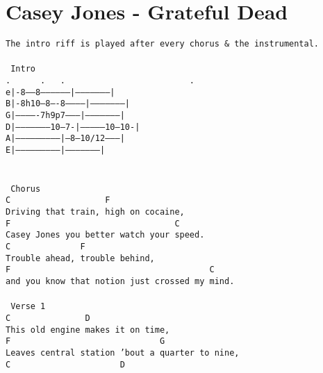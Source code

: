 \newpage
\section{Casey Jones - Grateful Dead}
\label{Casey Jones - Grateful Dead}
\texttt{The\ intro\ riff\ is\ played\ after\ every\ chorus\ \&\ the\ instrumental.\\
\\
\lbrack\ Intro\rbrack\\
. \ \ \ \ \ .\ \ \ .\ \ \ \ \ \ \ \ \ \ \ \ \ \ \ \ \ \ \ \ \ \ \ \ \ .\\
e|-8------8-----------------|---------------------|\\
B|-8h10---8----8------------|---------------------|\\
G|-------------7h9p7--------|---------------------|\\
D|--------------------10--7-|--------------10--10-|\\
A|--------------------------|---8---10/12---------|\\
E|--------------------------|---------------------|\\
\\
\\
\lbrack\ Chorus\rbrack\\
C\ \ \ \ \ \ \ \ \ \ \ \ \ \ \ \ \ \ \ F\\
Driving\ that\ train,\ high\ on\ cocaine,\\
F\ \ \ \ \ \ \ \ \ \ \ \ \ \ \ \ \ \ \ \ \ \ \ \ \ \ \ \ \ \ \ \ \ C\\
Casey\ Jones\ you\ better\ watch\ your\ speed.\\
C\ \ \ \ \ \ \ \ \ \ \ \ \ \ F\\
Trouble\ ahead,\ trouble\ behind,\\
F\ \ \ \ \ \ \ \ \ \ \ \ \ \ \ \ \ \ \ \ \ \ \ \ \ \ \ \ \ \ \ \ \ \ \ \ \ \ \ \ C\\
and\ you\ know\ that\ notion\ just\ crossed\ my\ mind.\\
\\
\lbrack\ Verse\ 1\rbrack\\
C\ \ \ \ \ \ \ \ \ \ \ \ \ \ \ D\\
This\ old\ engine\ makes\ it\ on\ time,\\
F\ \ \ \ \ \ \ \ \ \ \ \ \ \ \ \ \ \ \ \ \ \ \ \ \ \ \ \ \ \ G\\
Leaves\ central\ station\ 'bout\ a\ quarter\ to\ nine,\\
C\ \ \ \ \ \ \ \ \ \ \ \ \ \ \ \ \ \ \ \ \ \ D\\
}

